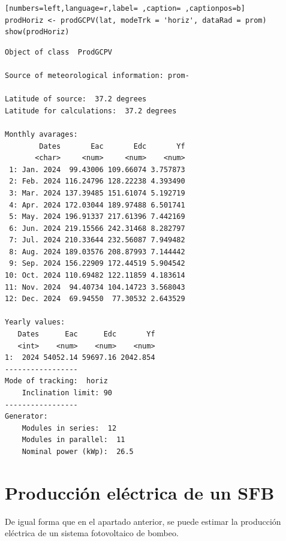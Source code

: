 \begin{lstlisting}[numbers=left,language=r,label= ,caption= ,captionpos=b]
prodHoriz <- prodGCPV(lat, modeTrk = 'horiz', dataRad = prom)
show(prodHoriz)
\end{lstlisting}

\begin{verbatim}
Object of class  ProdGCPV 

Source of meteorological information: prom- 

Latitude of source:  37.2 degrees
Latitude for calculations:  37.2 degrees

Monthly avarages:
        Dates       Eac       Edc       Yf
       <char>     <num>     <num>    <num>
 1: Jan. 2024  99.43006 109.66074 3.757873
 2: Feb. 2024 116.24796 128.22238 4.393490
 3: Mar. 2024 137.39485 151.61074 5.192719
 4: Apr. 2024 172.03044 189.97488 6.501741
 5: May. 2024 196.91337 217.61396 7.442169
 6: Jun. 2024 219.15566 242.31468 8.282797
 7: Jul. 2024 210.33644 232.56087 7.949482
 8: Aug. 2024 189.03576 208.87993 7.144442
 9: Sep. 2024 156.22909 172.44519 5.904542
10: Oct. 2024 110.69482 122.11859 4.183614
11: Nov. 2024  94.40734 104.14723 3.568043
12: Dec. 2024  69.94550  77.30532 2.643529

Yearly values:
   Dates      Eac      Edc       Yf
   <int>    <num>    <num>    <num>
1:  2024 54052.14 59697.16 2042.854
-----------------
Mode of tracking:  horiz 
    Inclination limit: 90 
-----------------
Generator:
    Modules in series:  12 
    Modules in parallel:  11 
    Nominal power (kWp):  26.5
\end{verbatim}

\section{Producción eléctrica de un SFB}
\label{sec:org97e725e}
De igual forma que en el apartado anterior, se puede estimar la producción eléctrica de un sistema fotovoltaico de bombeo.

